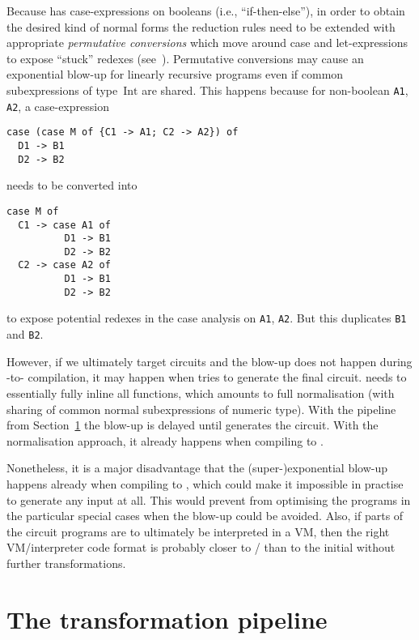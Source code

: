 \documentclass[final]{msc}
\begin{document}
Because \JuvixCore{} has case-expressions on booleans (i.e., ``if-then-else''), in order to obtain the desired kind of normal forms the reduction rules need to be extended with appropriate \emph{permutative conversions} which move around case and let-expressions to expose ``stuck'' redexes (see~\cite[Chapter~6]{basic-proof-theory}). Permutative conversions may cause an exponential blow-up for linearly recursive programs even if common subexpressions of type~$\mathrm{Int}$ are shared. This happens because for non-boolean \texttt{A1}, \texttt{A2}, a case-expression
\begin{verbatim}
case (case M of {C1 -> A1; C2 -> A2}) of
  D1 -> B1
  D2 -> B2
\end{verbatim}
needs to be converted into
\begin{verbatim}
case M of
  C1 -> case A1 of
          D1 -> B1
          D2 -> B2
  C2 -> case A2 of
          D1 -> B1
          D2 -> B2
\end{verbatim}
to expose potential redexes in the case analysis on \texttt{A1}, \texttt{A2}. But this duplicates \texttt{B1} and \texttt{B2}.

However, if we ultimately target circuits and the blow-up does not happen during \Juvix{}-to-\VampIR{} compilation, it
may happen when \VampIR{} tries to generate the final circuit. \VampIR{}
needs to essentially fully inline all functions, which amounts to full
normalisation (with sharing of common normal subexpressions of numeric
type). With the pipeline from
Section~\ref{sec_pipeline} the blow-up is delayed until \VampIR{}
generates the circuit. With the normalisation approach, it already
happens when compiling \Juvix{} to \VampIR{}.

Nonetheless, it is a major disadvantage that the (super-)exponential
blow-up happens already when compiling to \VampIR{}, which could make it
impossible in practise to generate any \VampIR{} input at all. This would
prevent \VampIR{} from optimising the programs in the particular special
cases when the blow-up could be avoided. Also, if parts of the circuit
programs are to ultimately be interpreted in a VM, then the right
VM/interpreter code format is probably closer to \Geb{}/\VampIR{} than to
the initial \JuvixCore{} without further transformations.

\section{The transformation pipeline}\label{sec_pipeline}
\end{document}
